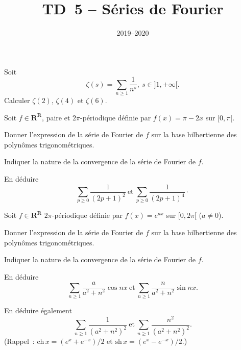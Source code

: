 \documentclass[11pt,a4paper]{article}
\title{TD~5 -- S\'eries de Fourier}
\date{2019--2020}
\def\R{\mathbf{R}}
\def\ch{\mathrm{ch}}
\def\sh{\mathrm{sh}}
\def\iy{\infty}
\begin{document}
\maketitle

\begin{Exercice}
Soit
$$ \zeta(s) = \sum_{n \geq 1} \frac{1}{n^s},\ s \in ]1,+\iy[. $$
Calculer $\zeta(2)$, $\zeta(4)$ et $\zeta(6)$. 
\end{Exercice} \vspace*{1em}

\begin{Exercice}
Soit $f \in \R^\R$, paire et $2\pi$-p\'eriodique d\'efinie par
$f(x)=\pi-2x$ sur $[0,\pi[$.
\begin{Question} Donner l'expression de la s\'erie de Fourier de $f$
sur la base hilbertienne des polyn\^omes trigonom\'etriques.
\end{Question}

\begin{Question} Indiquer la nature de la convergence de la s\'erie de
Fourier de $f$. \end{Question}

\begin{Question} En d\'eduire
$$ \sum_{p \geq 0} \frac{1}{(2p+1)^2}\ \text{et}\ 
   \sum_{p \geq 0} \frac{1}{(2p+1)^4}\cdot$$
\end{Question}
\end{Exercice} \vspace*{1em}

\begin{Exercice}
Soit $f \in \R^\R$ $2\pi$-p\'eriodique d\'efinie par
$f(x)=e^{ax}$ sur $[0,2\pi[$ ($a \neq 0$).
\begin{Question} Donner l'expression de la s\'erie de Fourier de $f$
sur la base hilbertienne des polyn\^omes trigonom\'etriques.
\end{Question}

\begin{Question} Indiquer la nature de la convergence de la s\'erie de
Fourier de $f$. \end{Question}

\begin{Question} En d\'eduire
$$ \sum_{n \geq 1} \frac{a}{a^2+n^2}\cos nx\ \text{et}\ 
   \sum_{n \geq 1} \frac{n}{a^2+n^2}\sin nx. $$
\end{Question}

\begin{Question} En d\'eduire \'egalement
$$ \sum_{n \geq 1} \frac{1}{(a^2+n^2)^2}\ \text{et}\ 
   \sum_{n \geq 1} \frac{n^2}{(a^2+n^2)^2}. $$
(Rappel~: $\ch\,x=(e^x+e^{-x})/2$ et $\sh\,x=(e^x-e^{-x})/2$.)
\end{Question}
\end{Exercice} \vspace*{1em}
\end{document}
